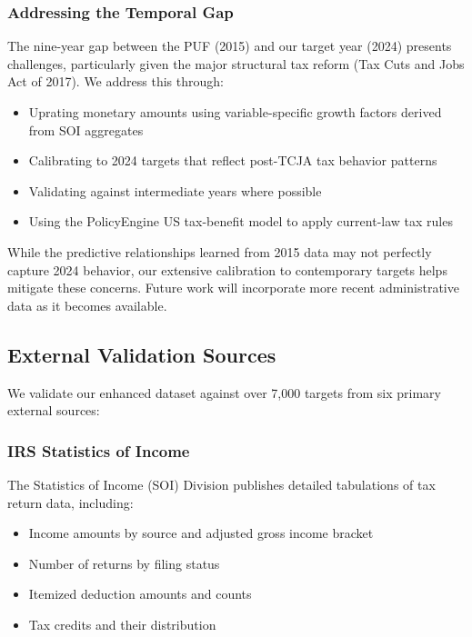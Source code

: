\subsubsection{Addressing the Temporal Gap}

The nine-year gap between the PUF (2015) and our target year (2024) presents challenges, particularly given the major structural tax reform (Tax Cuts and Jobs Act of 2017). We address this through:
\begin{itemize}
    \item Uprating monetary amounts using variable-specific growth factors derived from SOI aggregates
    \item Calibrating to 2024 targets that reflect post-TCJA tax behavior patterns
    \item Validating against intermediate years where possible
    \item Using the PolicyEngine US tax-benefit model to apply current-law tax rules
\end{itemize}

While the predictive relationships learned from 2015 data may not perfectly capture 2024 behavior, our extensive calibration to contemporary targets helps mitigate these concerns. Future work will incorporate more recent administrative data as it becomes available.

\subsection{External Validation Sources}

We validate our enhanced dataset against over 7,000 targets from six primary external sources:

\subsubsection{IRS Statistics of Income}

The Statistics of Income (SOI) Division publishes detailed tabulations of tax return data, including:
\begin{itemize}
    \item Income amounts by source and adjusted gross income bracket
    \item Number of returns by filing status
    \item Itemized deduction amounts and counts
    \item Tax credits and their distribution
\end{itemize}

